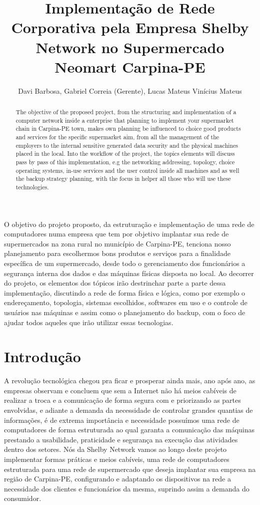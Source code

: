 \documentclass[12pt]{article}
\title{Implementação de Rede Corporativa pela Empresa Shelby Network no Supermercado Neomart Carpina-PE}
\author{Davi Barbosa\inst{1}, Gabriel Correia (Gerente)\inst{2}, Lucas Mateus\inst{3} Vinícius Mateus}
\begin{document}
 

\maketitle

\begin{abstract}
  The objective of the proposed project, from the structuring and implementation of a computer network inside a enterprise that planning to implement your supermarket chain in Carpina-PE town, makes own planning be influenced to choice good products and services for the specific supermarket aim, from all the management of the employers to the internal sensitive generated data security and the physical machines placed in the local. Into the workflow of the project, the topics elements will discuss pass by pass of this implementation, e.g the networking addressing, topology, choice operating systems, in-use services and the user control inside all machines and as well the backup strategy planning, with the focus in helper all those who will use these technologies.
\end{abstract}
     
\begin{resumo} 
  O objetivo do projeto proposto, da estruturação e implementação de uma rede de computadores numa empresa que tem por objetivo implantar sua rede de supermercados na zona rural no município de Carpina-PE, tenciona nosso planejamento para escolhermos bons produtos e serviços para a finalidade específica de um supermercado, desde todo o gerenciamento dos funcionários a segurança interna dos dados e das máquinas físicas disposta no local. Ao decorrer do projeto, os elementos dos tópicos irão destrinchar parte a parte dessa implementação, discutindo a rede de forma física e lógica, como por exemplo o endereçamento, topologia, sistemas escolhidos, softwares em uso e o controle de usuários nas máquinas e assim como o planejamento do backup, com o foco de ajudar todos aqueles que irão utilizar essas tecnologias.
\end{resumo}

\section{Introdução}
A revolução tecnológica chegou pra ficar e prosperar ainda mais, ano após ano, as empresas observam e concluem que sem a Internet não há meios cabíveis de realizar a troca e a comunicação de forma segura com e priorizando as partes envolvidas, e adiante a demanda da necessidade de controlar grandes quantias de informações, é de extrema importância e necessidade possuímos uma rede de computadores de forma estruturada ao qual garanta a comunicação das máquinas prestando a usabilidade, praticidade e segurança na execução das atividades dentro dos setores. Nós da Shelby Network vamos ao longo deste projeto implementar formas práticas e meios cabíveis, uma rede de computadores estruturada para uma rede de supermercado que deseja implantar sua empresa na região de Carpina-PE, configurando e adaptando os dispositivos na rede a necessidade dos clientes e funcionários da mesma, suprindo assim a demanda do consumidor.
\end{document}

